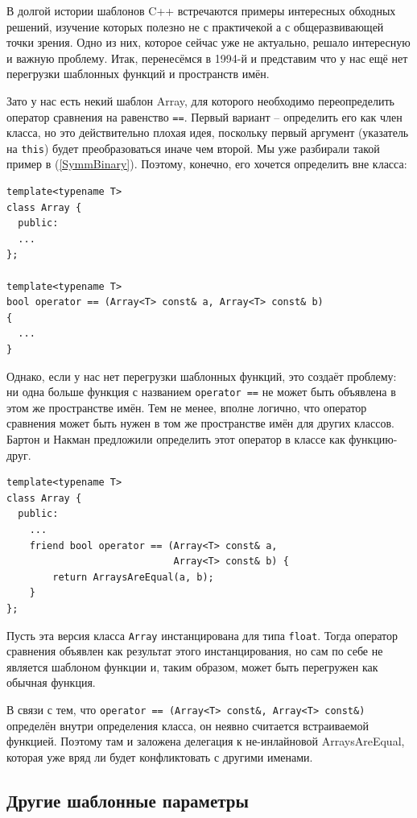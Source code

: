 \documentclass[a4paper,12pt,oneside]{article}
\begin{document}
В долгой истории шаблонов C++ встречаются примеры интересных обходных решений, изучение которых полезно не с практичекой а с общеразвивающей точки зрения. Одно из них, которое сейчас уже не актуально, решало интересную и важную проблему. Итак, перенесёмся в 1994-й и представим что у нас ещё нет перегрузки шаблонных функций и пространств имён.

Зато у нас есть некий шаблон Array, для которого необходимо переопределить оператор сравнения на равенство \lstinline!==!. Первый вариант -- определить его как член класса, но это действительно плохая идея, поскольку первый аргумент (указатель на \lstinline!this!) будет преобразоваться иначе чем второй. Мы уже разбирали такой пример в (\ref{SymmBinary}). Поэтому, конечно, его хочется определить вне класса:

\begin{lstlisting}
template<typename T> 
class Array { 
  public: 
  ...
}; 

template<typename T> 
bool operator == (Array<T> const& a, Array<T> const& b) 
{ 
  ... 
} 
\end{lstlisting}

Однако, если у нас нет перегрузки шаблонных функций, это создаёт проблему: ни одна больше функция с названием \lstinline!operator ==! не может быть объявлена в этом же пространстве имён. Тем не менее, вполне логично, что оператор сравнения может быть нужен в том же пространстве имён для других классов. Бартон и Накман предложили определить этот оператор в классе как функцию-друг.

\begin{lstlisting}
template<typename T> 
class Array { 
  public: 
    ... 
    friend bool operator == (Array<T> const& a, 
                             Array<T> const& b) { 
        return ArraysAreEqual(a, b); 
    } 
}; 
\end{lstlisting}

Пусть эта версия класса \lstinline!Array! инстанцирована для типа \lstinline!float!. Тогда оператор сравнения объявлен как результат этого инстанцирования, но сам по себе не является шаблоном функции и, таким образом, может быть перегружен как обычная функция.

В связи с тем, что \lstinline!operator == (Array<T> const&, Array<T> const&)! определён внутри определения класса, он неявно считается встраиваемой функцией. Поэтому там и заложена делегация к не-инлайновой ArraysAreEqual, которая уже вряд ли будет конфликтовать с другими именами.

\subsection{Другие шаблонные параметры}
\end{document}
